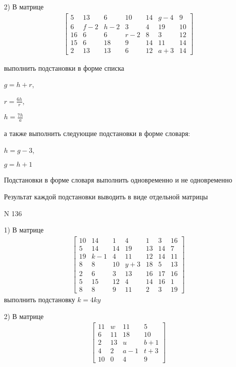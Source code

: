 \documentclass[11pt]{report}
\begin{document}
    2) В матрице
\begin{align*}
\left[\begin{matrix}5 & 13 & 6 & 10 & 14 & g - 4 & 9\\6 & f - 2 & h - 2 & 3 & 4 & 19 & 10\\16 & 6 & 6 & r - 2 & 8 & 3 & 12\\15 & 6 & 18 & 9 & 14 & 11 & 14\\2 & 13 & 13 & 6 & 12 & a + 3 & 14\end{matrix}\right]
\end{align*}

выполнить подстановки в форме списка

$g=h + r$,

$r=\frac{6 h}{r}$,

$h=\frac{7 h}{a}$

а также выполнить следующие подстановки в форме словаря:

$h=g - 3$,

$g=h + 1$


    Подстановки в форме словаря выполнить одновременно и не одновременно


    Результат каждой подстановки выводить в виде отдельной матрицы

\newpage
N 136


    1) В матрице
\begin{align*}
\left[\begin{matrix}10 & 14 & 1 & 4 & 1 & 3 & 16\\5 & 14 & 14 & 19 & 13 & 14 & 7\\19 & k - 1 & 4 & 11 & 12 & 14 & 11\\8 & 8 & 10 & y + 3 & 18 & 5 & 13\\2 & 6 & 3 & 13 & 16 & 17 & 16\\5 & 15 & 12 & 4 & 14 & 16 & 1\\8 & 8 & 9 & 11 & 2 & 3 & 19\end{matrix}\right]
\end{align*}
выполнить подстановку $k=4 k y$


    2) В матрице
\begin{align*}
\left[\begin{matrix}11 & w & 11 & 5\\6 & 11 & 18 & 10\\2 & 13 & u & b + 1\\4 & 2 & a - 1 & t + 3\\10 & 0 & 4 & 9\end{matrix}\right]
\end{align*}
\end{document}
